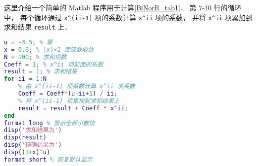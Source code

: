 
这里介绍一个简单的 Matlab 程序用于计算\autoref{BiNorR_tab1}． 第 7-10 行的循环中， 每个循环通过 \verb|x^(ii-1)| 项的系数计算 \verb|x^ii| 项的系数， 并将 \verb|x^ii| 项累加到求和结果 \verb|result| 上．

\begin{lstlisting}[language=matlab, caption=binorR.m]
% 验证二项式定理(非整数幂)
u = -3.5; % 幂
x = 0.6; % |x|<1 使级数收敛
N = 100; % 求和项数
Coeff = 1; % x^ii 项前面的系数
result = 1; % 求和结果
for ii = 1:N
    % 由 x^(ii-1) 项系数计算 x^ii 项系数
    Coeff = Coeff*(u-ii+1) / ii; 
    % 将 x^(ii-1) 项累加到求和结果上
    result = result + Coeff * x^ii; 
end
format long % 显示全部小数位
disp('求和结果为')
disp(result)
disp('精确结果为')
disp((1+x)^u)
format short % 恢复默认显示
\end{lstlisting}
